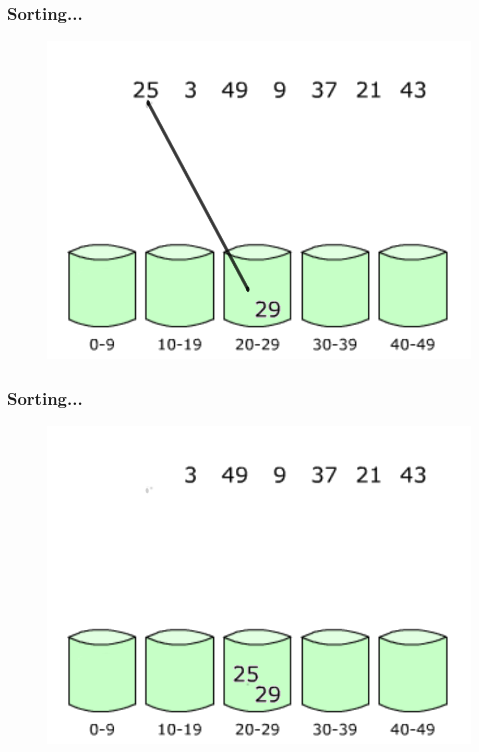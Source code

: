 \documentclass[pdf]{beamer}
\begin{document}
\begin{frame}
	\frametitle{Sorting...}
	\begin{figure}
		\includegraphics[scale=.3]{Figure/3.png}
	\end{figure}	
\end{frame}

\begin{frame}
	\frametitle{Sorting...}
	\begin{figure}
		\includegraphics[scale=.3]{Figure/4.png}
	\end{figure}	
\end{frame}
\end{document}
